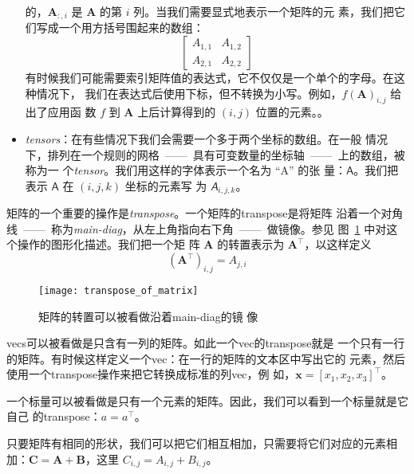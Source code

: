 \begin{itemize}
  的，$\pmb{A}_{:,i}$ 是 $\pmb{A}$ 的第 $i$ 列。当我们需要显式地表示一个矩阵的元
  素，我们把它们写成一个用方括号围起来的数组：
  \begin{equation}
    \begin{bmatrix}A_{1,1} & A_{1,2} \\ A_{2,1} & A_{2,2}\end{bmatrix}
    \label{eq:matrix_example}
  \end{equation}
  有时候我们可能需要索引矩阵值的表达式，它不仅仅是一个单个的字母。在这种情况下，
  我们在表达式后使用下标，但不转换为小写。例如，$f(\pmb{A})_{i,j}$ 给出了应用函
  数 $f$ 到 $\pmb{A}$ 上后计算得到的 $(i,j)$ 位置的元素。。
\item \emph{\gls{tensors}}：在有些情况下我们会需要一个多于两个坐标的数组。在一般
  情况下，排列在一个规则的网格~——~具有可变数量的坐标轴~——~上的数组，被称为一
  个\emph{\gls{tensor}}。我们用这样的字体表示一个名为 ``A'' 的张
  量：$\pmb{\mathsf{A}}$。我们把表示 $\pmb{\mathsf{A}}$ 在 $(i,j,k)$ 坐标的元素写
  为 $\mathsfit{A}_{i,j,k}$。
\end{itemize}

矩阵的一个重要的操作是\emph{\gls{transpose}}。一个矩阵的\gls*{transpose}是将矩阵
沿着一个对角线~——~称为\emph{\gls{main-diag}}，从左上角指向右下角~——~做镜像。参见
图~\ref{fig:transpose_of_matrix} 中对这个操作的图形化描述。我们把一个矩
阵 $\pmb{A}$ 的转置表示为 $\pmb{A}^{\top}$，以这样定义
\begin{equation}
  (\pmb{A}^{\top})_{i,j} = A_{j,i}
  \label{eq:transpose_of_matrix}
\end{equation}

\begin{figure}[h]
  \centering
  \texttt{[image: transpose\_of\_matrix]}
  \caption{矩阵的转置可以被看做沿着\gls*{main-diag}的镜
    像\label{fig:transpose_of_matrix}}
\end{figure}

\gls*{vecs}可以被看做是只含有一列的矩阵。如此一个\gls*{vec}的\gls*{transpose}就是
一个只有一行的矩阵。有时候这样定义一个\gls*{vec}：在一行的矩阵的文本区中写出它的
元素，然后使用一个\gls*{transpose}操作来把它转换成标准的列\gls*{vec}，例
如，$\pmb{x} = [x_1, x_2, x_3]^{\top}$。

一个标量可以被看做是只有一个元素的矩阵。因此，我们可以看到一个标量就是它自己
的\gls*{transpose}：$a = a^{\top}$。

只要矩阵有相同的形状，我们可以把它们相互相加，只需要将它们对应的元素相
加：$\pmb{C} = \pmb{A} + \pmb{B}$，这里 $C_{i,j} = A_{i,j} + B_{i,j}$。

